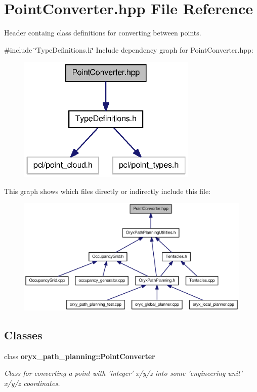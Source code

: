 \section{\-Point\-Converter.\-hpp \-File \-Reference}
\label{PointConverter_8hpp}


\-Header containg class definitions for converting between points.  


{\ttfamily \#include \char`\"{}\-Type\-Definitions.\-h\char`\"{}}\*
\-Include dependency graph for \-Point\-Converter.\-hpp\-:
\nopagebreak
\begin{figure}[H]
\begin{center}
\leavevmode
\includegraphics[width=242pt]{PointConverter_8hpp__incl}
\end{center}
\end{figure}
\-This graph shows which files directly or indirectly include this file\-:
\nopagebreak
\begin{figure}[H]
\begin{center}
\leavevmode
\includegraphics[width=350pt]{PointConverter_8hpp__dep__incl}
\end{center}
\end{figure}
\subsection*{\-Classes}
\begin{DoxyCompactItemize}
\item 
class {\bf oryx\-\_\-path\-\_\-planning\-::\-Point\-Converter}
\begin{DoxyCompactList}\small\item\em \-Class for converting a point with 'integer' x/y/z into some 'engineering unit' x/y/z coordinates. \end{DoxyCompactList}\end{DoxyCompactItemize}
